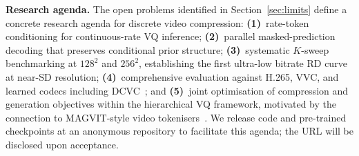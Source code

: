 \documentclass[sigconf, screen, review, anonymous]{acmart}
\begin{document}
\noindent\textbf{Research agenda.}
The open problems identified in Section~\ref{sec:limits} define a
concrete research agenda for discrete video compression:
\textbf{(1)}~rate-token conditioning for continuous-rate VQ inference;
\textbf{(2)}~parallel masked-prediction decoding that preserves
conditional prior structure;
\textbf{(3)}~systematic $K$-sweep benchmarking at $128^2$ and $256^2$,
establishing the first ultra-low bitrate RD curve at near-SD resolution;
\textbf{(4)}~comprehensive evaluation against H.265, VVC, and learned
codecs including DCVC~\cite{li2021dcvc};
and \textbf{(5)}~joint optimisation of compression and generation
objectives within the hierarchical VQ framework, motivated by the
connection to MAGVIT-style video tokenisers~\cite{yu2023magvit,yu2024magvit2}.
We release code and pre-trained checkpoints at an anonymous repository
to facilitate this agenda; the URL will be disclosed upon acceptance.
\end{document}
